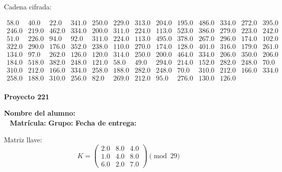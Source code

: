 \documentclass[12pt]{article}
\begin{document}
Cadena cifrada:
\begin{center}
$\begin{array}{lllllllllllll}
58.0 & 40.0 & 22.0 & 341.0 & 250.0 & 229.0 & 313.0 & 204.0 & 195.0 & 486.0 & 334.0 & 272.0 & 395.0\\
246.0 & 219.0 & 462.0 & 334.0 & 200.0 & 311.0 & 224.0 & 113.0 & 523.0 & 386.0 & 279.0 & 223.0 & 242.0\\
51.0 & 226.0 & 94.0 & 92.0 & 311.0 & 224.0 & 113.0 & 495.0 & 378.0 & 267.0 & 296.0 & 174.0 & 102.0\\
322.0 & 290.0 & 176.0 & 352.0 & 238.0 & 110.0 & 270.0 & 174.0 & 128.0 & 401.0 & 316.0 & 179.0 & 261.0\\
134.0 & 97.0 & 262.0 & 126.0 & 120.0 & 314.0 & 250.0 & 200.0 & 464.0 & 334.0 & 206.0 & 350.0 & 206.0\\
184.0 & 518.0 & 382.0 & 248.0 & 121.0 & 58.0 & 49.0 & 294.0 & 214.0 & 152.0 & 282.0 & 248.0 & 70.0\\
310.0 & 212.0 & 166.0 & 334.0 & 258.0 & 188.0 & 282.0 & 248.0 & 70.0 & 310.0 & 212.0 & 166.0 & 334.0\\
258.0 & 188.0 & 310.0 & 256.0 & 82.0 & 269.0 & 212.0 & 95.0 & 276.0 & 130.0 & 126.0\\
\end{array}$
\end{center}

\newpage


\textbf{Proyecto 221}

\textbf{Nombre del alumno:} \underline{\hspace{13cm}}\\\
\vspace{1cm}
\textbf{Matrícula:} \underline{\hspace{4cm}} \hspace{1cm}
\textbf{Grupo:} \underline{\hspace{2cm}}
\textbf{Fecha de entrega:} \underline{\hspace{2cm}}

\medskip

Matriz llave:
\[
K = \begin{pmatrix}
2.0 & 8.0 & 4.0\\
1.0 & 4.0 & 8.0\\
6.0 & 2.0 & 7.0
\end{pmatrix} \pmod{29}
\]
\end{document}
